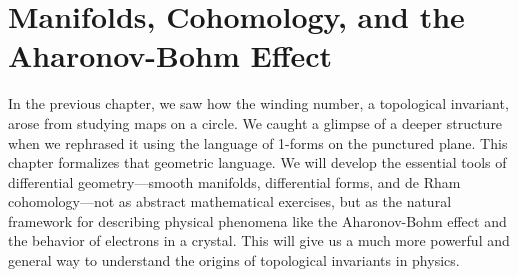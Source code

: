 \chapter{Manifolds, Cohomology, and the Aharonov-Bohm Effect}
\label{chap:manifolds_cohomology}

In the previous chapter, we saw how the winding number, a topological invariant, arose from studying maps on a circle. We caught a glimpse of a deeper structure when we rephrased it using the language of 1-forms on the punctured plane. This chapter formalizes that geometric language. We will develop the essential tools of differential geometry—smooth manifolds, differential forms, and de Rham cohomology—not as abstract mathematical exercises, but as the natural framework for describing physical phenomena like the Aharonov-Bohm effect and the behavior of electrons in a crystal. This will give us a much more powerful and general way to understand the origins of topological invariants in physics.





